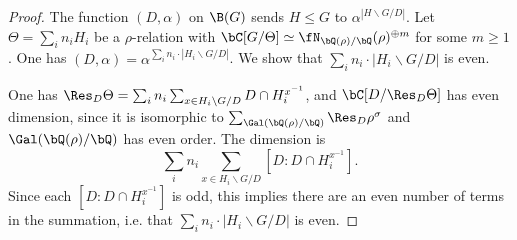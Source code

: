 \begin{proof}
    The function $(D, \alpha)$ on $\B(G)$ sends $H \leq G$ to $\alpha^{| H \backslash G / D|}$. Let $\Theta = \sum_i n_i H_i$ be a $\rho$-relation with $\bC[G / \Theta] \simeq \repnorm{\rho}^{\oplus m}$ for some $m \geq 1$. One has $(D, \alpha) = \alpha^{\sum_i n_i \cdot | H_i \backslash G / D|}$. We show that $\sum_i n_i \cdot | H_i \backslash G / D |$ is even.

    One has $\Res_D \Theta = \sum_i n_i \sum_{x \in H_i \backslash G / D} D \cap H_i^{x^{-1}}$, and $\bC[D / \Res_D \Theta]$ has even dimension, since it is isomorphic to $\sum_{\Gal(\bQ(\rho) / \bQ)} \Res_D \rho^{\sigma}$ and $\Gal(\bQ(\rho) / \bQ)$ has even order. The dimension is $$\sum_i n_i \sum_{x \in H_i \backslash G / D} [D : D \cap H_i^{x^{-1}} ].$$ Since each $[D : D \cap H_i^{x^{-1}} ]$ is odd, this implies there are an even number of terms in the summation, i.e. that $\sum_i n_i \cdot | H_i \backslash G / D|$ is even. 

\end{proof}





